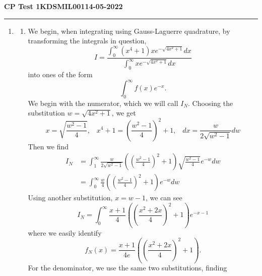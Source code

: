 \documentclass[11pt]{article}
\begin{document}
\begin{center}
    \textbf{CP Test 1}\hspace{1.5in}\textbf{KDSMIL001}\hspace{1.5in}\textbf{14-05-2022}
\end{center}
\rule{\textwidth}{1pt}

\begin{enumerate}
    \item \begin{enumerate}
        \item We begin, when integrating using Gauss-Laguerre quadrature, by transforming the integrals in question,
        \begin{equation}
            I = \frac{\int_0^\infty (x^4 +1)xe^{-\sqrt{4x^2 +1}}dx}{\int_0^\infty xe^{-\sqrt{4x^2 +1}}dx}
            \label{eqn:Q1Integral}
        \end{equation}
        into ones of the form
        \begin{equation}
            \int_0^\infty f(x)e^{-x}.
            \label{eqn:GaussLaguerreGenForm}
        \end{equation}
        We begin with the numerator, which we will call $I_N$. Choosing the substitution $w=\sqrt{4x^2+1}$, we get
        \begin{equation*}
            x=\sqrt{\frac{w^2-1}{4}}, \;\;\; x^4+1=\left(\frac{w^2-1}{4}\right)^2+1, \;\;\; dx=\frac{w}{2\sqrt{w^2-1}}dw 
        \end{equation*}
        Then we find 
        \begin{align*}
            I_N&=\int_1^\infty \frac{w}{2\sqrt{w^2-1}} \left(\left(\frac{w^2-1}{4}\right)^2+1\right) \sqrt{\frac{w^2-1}{4}} e^{-w} dw\\
            &=\int_0^\infty \frac{w}{4}\left(\left(\frac{w^2-1}{4}\right)^2+1\right)e^{-w} dw
        \end{align*}
        Using another substitution, $x=w-1$, we can see 
        \begin{equation}
            I_N = \int_0^\infty \frac{x+1}{4}\left(\left(\frac{x^2+2x}{4}\right)^2+1\right)e^{-x-1}
            \label{eqn:q1iNumerator}
        \end{equation}
        where we easily identify
        \begin{equation}
            f_N(x) = \frac{x+1}{4e}\left(\left(\frac{x^2+2x}{4}\right)^2+1\right).
            \label{eqn:q1iFN}
        \end{equation}
        For the denominator, we use the same two substitutions, finding

\end{enumerate}
\end{enumerate}
\end{document}
